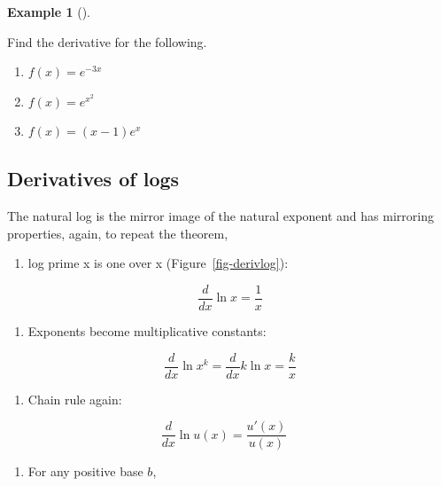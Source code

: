 \documentclass[
  letterpaper,
]{book}
\providecommand{\tightlist}{%
  \setlength{\itemsep}{0pt}\setlength{\parskip}{0pt}}\usepackage{longtable,booktabs,array}
\theoremstyle{definition}
\theoremstyle{definition}
\newtheorem{example}{Example}[chapter]
\theoremstyle{plain}
\theoremstyle{definition}
\theoremstyle{plain}
\theoremstyle{plain}
\theoremstyle{remark}
\begin{document}
\leavevmode{}%
\begin{example}[]\label{exm-exmderivexp}

Find the derivative for the following.

\begin{enumerate}
\def\labelenumi{\arabic{enumi}.}
\tightlist
\item
  \(f(x)=e^{-3x}\)
\item
  \(f(x)=e^{x^2}\)
\item
  \(f(x)=(x-1)e^x\)
\end{enumerate}

\end{example}

\hypertarget{derivatives-of-logs}{%
\subsection*{Derivatives of logs}\label{derivatives-of-logs}}

The natural log is the mirror image of the natural exponent and has
mirroring properties, again, to repeat the theorem,

\begin{enumerate}
\def\labelenumi{\arabic{enumi}.}
\tightlist
\item
  log prime x is one over x (Figure~\ref{fig-derivlog}):
\end{enumerate}

\[\frac{d}{dx} \ln x = \frac{1}{x}\]

\begin{enumerate}
\def\labelenumi{\arabic{enumi}.}
\setcounter{enumi}{1}
\tightlist
\item
  Exponents become multiplicative constants:
\end{enumerate}

\[\frac{d}{dx} \ln x^k = \frac{d}{dx} k \ln x = \frac{k}{x}\]

\begin{enumerate}
\def\labelenumi{\arabic{enumi}.}
\setcounter{enumi}{2}
\tightlist
\item
  Chain rule again:
\end{enumerate}

\[\frac{d}{dx} \ln u(x) = \frac{u'(x)}{u(x)}\quad\]

\begin{enumerate}
\def\labelenumi{\arabic{enumi}.}
\setcounter{enumi}{3}
\tightlist
\item
  For any positive base \(b\),
\end{enumerate}
\end{document}
